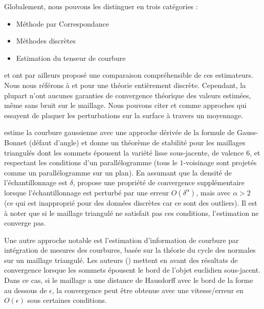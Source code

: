 Globalement, nous pouvons les distinguer en trois catégories :
\begin{itemize}
  \item Méthode par Correspondance
  \item Méthodes discrètes
  \item Estimation du tenseur de courbure
\end{itemize}

 et  ont par
ailleurs proposé une comparaison compréhensible de ces estimateurs. Nous nous
référons à  et 
pour une théorie entièrement discrète. Cependant, la plupart n'ont aucunes
garanties de convergence théorique des valeurs estimées, même sans bruit sur le
maillage. Nous pouvons citer \cite{Page2002} et \cite{Rusinkiewicz2004} comme
approches qui essayent de plaquer les perturbations sur la surface à travers un
moyennage.

 estime la courbure gaussienne avec une
approche dérivée de la formule de Gauss-Bonnet (défaut d'angle) et donne un
théorème de stabilité pour les maillages triangulés dont les sommets épousent la
variété lisse sous-jacente, de valence $6$, et respectant les conditions d'un
parallélogramme (tous le $1$-voisinage sont projetés comme un parallélogramme
sur un plan). En assumant que la densité de l’échantillonnage est $\delta$,
 propose une propriété de convergence supplémentaire lorsque
l'échantillonnage est perturbé par une erreur $O(\delta^\alpha)$, mais avec
$\alpha > 2$ (ce qui est inapproprié pour des données discrètes car ce sont des
outliers).  Il est à noter que si le maillage triangulé ne satisfait pas ces
conditions, l'estimation ne converge pas.

Une autre approche notable est l'estimation d'information de
courbure par intégration de mesures des courbures, basée sur la théorie du cycle
des normales \cite{CohenSteiner2003,CohenSteiner2006} sur un maillage triangulé.
Les auteurs () mettent en avant des résultats de
convergence lorsque les sommets épousent le bord de l'objet euclidien
sous-jacent. Dans ce cas, si le maillage a une distance de Hausdorff avec le
bord de la forme au dessous de $\epsilon$, la convergence peut être obtenue avec
une vitesse/erreur en $O(\epsilon)$ sous certaines conditions.

